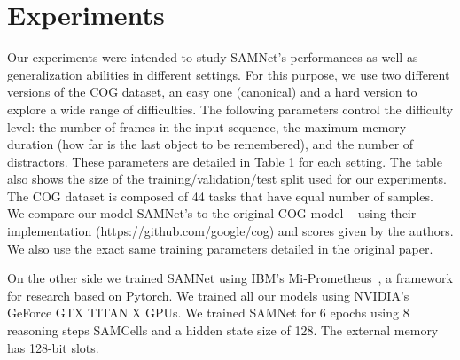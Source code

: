 \section{Experiments}

Our experiments were intended to study SAMNet's performances as well as generalization abilities in different settings. For this purpose, we use two different versions of the COG dataset, an easy one (canonical) and a hard version to explore a wide range of difficulties. The following parameters control the difficulty level: the number of frames in the input sequence, the maximum memory duration (how far is the last object to be remembered), and the number of distractors. These parameters are detailed in Table 1 for each setting. The table also shows the size of the training/validation/test split used for our experiments. The COG dataset is composed of 44 tasks that have equal number of samples.
We compare our model SAMNet's to the original COG model  ~\cite{yang2018dataset} using their implementation (https://github.com/google/cog) and scores given by the authors. We also use the exact same training parameters detailed in the original paper.

On the other side we trained SAMNet using IBM's Mi-Prometheus~\cite{kornuta2018accelerating}, a framework for research based on Pytorch. We trained all our models using NVIDIA’s GeForce GTX TITAN X GPUs. We trained  SAMNet for 6 epochs using 8 reasoning steps SAMCells and a hidden state size of 128. The external memory has 128-bit slots.



